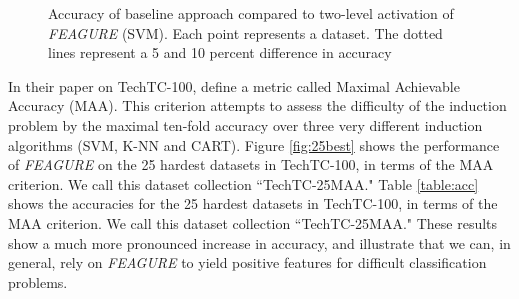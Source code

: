 \documentclass[twoside,11pt]{article}
\theoremstyle{definition}
\begin{document}
\begin{figure}
\begin{minipage}{0.45\textwidth}
		\caption{Accuracy of
			baseline approach compared to two-level activation of \emph{FEAGURE} (SVM). Each point represents a dataset. The dotted lines represent a 5 and 10 percent difference in accuracy}
		\label{fig:svm_base_lvl2}
	\end{minipage}
\end{figure}


In their paper on TechTC-100,  define a metric called Maximal Achievable Accuracy (MAA). This criterion attempts to assess the difficulty of the induction problem by the maximal ten-fold accuracy over three very different induction algorithms (SVM, K-NN and CART).
Figure \ref{fig:25best} shows the performance of \emph{FEAGURE} on the 25 hardest datasets in TechTC-100, in terms of the MAA criterion. We call this dataset collection ``TechTC-25MAA." 
Table \ref{table:acc} shows the accuracies for the 25 hardest datasets in TechTC-100, in terms of the MAA criterion. We call this dataset collection ``TechTC-25MAA." 
These results show a much more pronounced increase in accuracy, and illustrate that we can, in general, rely on \emph{FEAGURE} to yield positive features for difficult classification problems.
\end{document}
